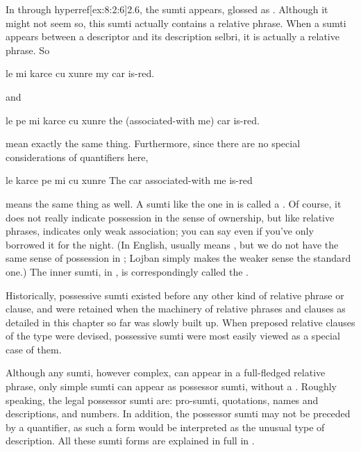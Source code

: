 In  through hyperref[ex:8:2:6]{2.6}, the sumti  appears,
    glossed as . Although it might not seem so, this
    sumti actually contains a relative phrase. When a sumti appears
    between a descriptor and its description selbri, it is actually
    a  relative phrase. So
\begin{example}
le mi karce cu xunre\n
my car is-red.
\end{example}

{\noindent}and
\begin{example}
le pe mi karce cu xunre\n
the (associated-with me) car is-red.
\end{example}

{\noindent}mean exactly the same thing. Furthermore, since there are no
    special considerations of quantifiers here,
\begin{example}
le karce pe mi cu xunre\n
The car associated-with me is-red
\end{example}

{\noindent}means the same thing as well. A sumti like the one in  is called a .
    Of course, it does not really indicate possession in the sense
    of ownership, but like  relative phrases, indicates only
    weak association; you can say  even if you've
    only borrowed it for the night. (In English,  usually
    means , but we do not have the same sense of
    possession in ; Lojban simply makes the
    weaker sense the standard one.) The inner sumti,  in , is correspondingly called the
    . 

Historically, possessive sumti existed before any other kind
    of relative phrase or clause, and were retained when the
    machinery of relative phrases and clauses as detailed in this
    chapter so far was slowly built up. When preposed relative
    clauses of the  type were
    devised, possessive sumti were most easily viewed as a special
    case of them.

Although any sumti, however complex, can appear in a
    full-fledged relative phrase, only simple sumti can appear as
    possessor sumti, without a . Roughly speaking, the legal
    possessor sumti are: pro-sumti, quotations, names and
    descriptions, and numbers. In addition, the possessor sumti may
    not be preceded by a quantifier, as such a form would be
    interpreted as the unusual 
    type of description. All these sumti forms are explained in
    full in .

